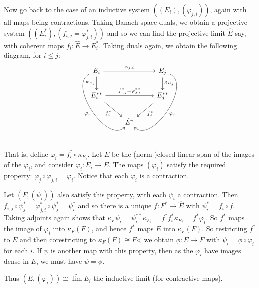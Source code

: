 \documentclass[a4paper,11pt]{article}
\newcommand{\id}{\operatorname{id}}
\theoremstyle{definition}
\newtheorem{example}[lemma]{Example}
\begin{document}
Now go back to the case of an inductive system $((E_i), (\varphi_{j,i}))$, again with all maps being contractions.
Taking Banach space duals, we obtain a projective system $((E_i^*), (f_{i,j} = \varphi_{j,i}^*))$ and so we can find the projective limit $\hat E$ say, with coherent maps $f_i \colon \hat E \to E_i^*$.  Taking duals again, we obtain the following diagram, for $i\leq j$:
\[ \begin{tikzcd}
E_i \arrow[rr, "\varphi_{j,i}"] \arrow[d, "\kappa_{E_i}"'] \arrow[rdd,"\varphi_i"',bend right=100]
   && E_j \arrow[d, "\kappa_{E_j}"] \arrow[ddl, "\varphi_j", bend left=100] \\
E_i^{**} \arrow[rr, "f_{i,j}^* = \varphi_{j,i}^{**}"] \arrow[rd, "f_i^*"'] && E_j^{**} \arrow[ld, "f_j^*"]\\
& \hat E^*
\end{tikzcd}
\]
That is, define $\varphi_i = f_i^*\circ\kappa_{E_i}$.  Let $E$ be the (norm-)closed linear span of the images of the $\varphi_i$, and consider $\varphi_i \colon E_i\to E$.  The maps $(\varphi_i)$ satisfy the required property: $\varphi_j \circ \varphi_{j,i} = \varphi_i$.  Notice that each $\varphi_i$ is a contraction.

Let $(F, (\psi_i))$ also satisfy this property, with each $\psi_i$ a contraction.
Then $f_{i,j} \circ \psi_j^* = \varphi_{j,i}^* \circ \psi_j^* = \psi_i^*$ and so there is a unique $f \colon F^* \to \hat E$ with $\psi_i^* = f_i \circ f$.  Taking adjoints again shows that $\kappa_F \psi_i = \psi_i^{**} \kappa_{E_i} = f^* f_i^* \kappa_{E_i} = f^* \varphi_i$.  So $f^*$ maps the image of $\varphi_i$ into $\kappa_F(F)$, and hence $f^*$ maps $E$ into $\kappa_F(F)$.  So restricting $f^*$ to $E$ and then corestricting to $\kappa_F(F) \cong F$< we obtain $\phi \colon E \to F$ with $\psi_i = \phi \circ \varphi_i$ for each $i$.  If $\psi$ is another map with this property, then as the $\varphi_i$ have images dense in $E$, we must have $\psi=\phi$.

Thus $(E, (\varphi_i)) \cong \underrightarrow{\lim} E_i$ the inductive limit (for contractive maps).

\end{document}
